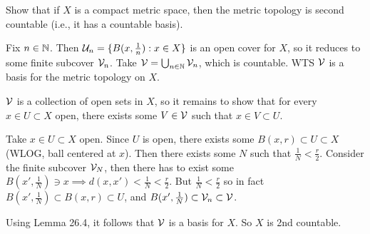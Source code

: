 \documentclass[a4paper, 10pt]{article}
\begin{document}
\begin{problem} [\done]
    Show that if $X$ is a compact metric space, then the metric topology is second countable (i.e., it has a countable basis).
\end{problem}
\begin{solution}
    Fix $n \in \mathbb{N}$. Then $\mathcal{U}_n = \{B(x, \frac{1}{n}) : x \in X\}$ is an open cover for $X$, so it reduces to some finite subcover $\mathcal{V}_n$. Take $\mathcal{V} = \bigcup_{n \in \mathbb{N}} \mathcal{V}_n$, which is countable. WTS $\mathcal{V}$ is a basis for the metric topology on $X$.

    $\mathcal{V}$ is a collection of open sets in $X$, so it remains to show that for every $x \in U \subset X$ open, there exists some $V \in \mathcal{V}$ such that $x \in V \subset U$.

    Take $x \in U \subset X$ open. Since $U$ is open, there exists some $B(x, r) \subset U \subset X$ (WLOG, ball centered at $x$). Then there exists some $N$ such that $\frac{1}{N} < \frac{r}{2}$. Consider the finite subcover $\mathcal{V}_N$, then there has to exist some $B(x', \frac{1}{N}) \ni x \implies d(x, x') < \frac{1}{N}< \frac{r}{2}$. But $\frac{1}{N} < \frac{r}{2}$ so in fact $B(x', \frac{1}{N}) \subset B(x, r) \subset U$, and $B(x', \frac{1}{N}) \subset \mathcal{V}_n \subset \mathcal{V}$.

    Using Lemma 26.4, it follows that $\mathcal{V}$ is a basis for $X$. So $X$ is 2nd countable.
\end{solution}
\end{document}
